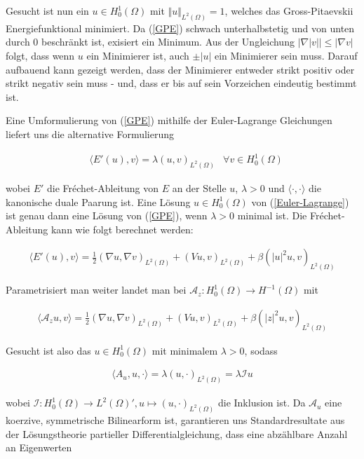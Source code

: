 \documentclass[final,bibliography=totocnumbered]{include/seminar}
\newcommand{\Ltwo}{\ensuremath{{L^2(\Omega)}}}
\newcommand{\Honez}{\ensuremath{{H^1_0(\Omega)}}}
\newcommand{\Hdual}{\ensuremath{{H^{-1}(\Omega)}}}
\newcommand{\mA}{\ensuremath{\mathcal{A}}}
\newcommand{\mI}{\ensuremath{\mathcal{I}}}
\newcommand{\GPEnergy}{Gross-Pitaevskii Energiefunktional}
\theoremstyle{break}
\begin{document}
\medskip

Gesucht ist nun ein $u \in \Honez$ mit $\Vert u \Vert_\Ltwo = 1$, welches das {\GPEnergy} minimiert.
Da (\ref{GPE}) schwach unterhalbstetig und von unten durch $0$ beschränkt ist,
exisiert ein Minimum.
Aus der Ungleichung $\vert\nabla\vert v \vert\vert \leq \vert\nabla v\vert$
folgt, dass wenn $u$ ein Minimierer ist, auch $\pm \vert u \vert$ ein Minimierer
sein muss.
Darauf aufbauend kann gezeigt werden, dass der Minimierer entweder strikt
positiv oder strikt negativ sein muss - und, dass er bis auf sein Vorzeichen
eindeutig bestimmt ist.\cite{sign}

\medskip

Eine Umformulierung von (\ref{GPE}) mithilfe der Euler-Lagrange Gleichungen
liefert uns die alternative Formulierung

\begin{align}\label{Euler-Lagrange}
    &\langle E'(u), v \rangle = \lambda(u,v)_\Ltwo &\forall v \in \Honez
\end{align}

wobei $E'$ die Fréchet-Ableitung von $E$ an der Stelle $u$, $\lambda > 0$
und $\langle \cdot,\cdot \rangle$ die kanonische duale Paarung ist.
Eine Lösung $u \in \Honez$ von (\ref{Euler-Lagrange}) ist genau dann eine Lösung von (\ref{GPE}),
wenn $\lambda > 0$ minimal ist. Die Fréchet-Ableitung kann wie folgt berechnet werden:

\begin{align}
    \langle E'(u), v\rangle = \frac{1}{2}(\nabla u, \nabla v)_\Ltwo
    + (Vu, v)_\Ltwo + \beta(\vert u \vert^2 u, v)_\Ltwo
\end{align}

Parametrisiert man weiter landet man bei $\mA_z: \Honez \rightarrow \Hdual$ mit

\begin{align}
    \langle\mA_z u, v\rangle = \frac{1}{2}(\nabla u, \nabla v)_\Ltwo
    + (Vu, v)_\Ltwo + \beta(\vert z \vert^2 u, v)_\Ltwo
\end{align}

Gesucht ist also das $u \in \Honez$ mit minimalem $\lambda > 0$, sodass

\begin{align}\label{EVP}
    \langle A_u, u, \cdot\rangle = \lambda(u, \cdot)_\Ltwo = \lambda\mI u
\end{align}

wobei $\mI: \Honez \rightarrow \Ltwo', u \mapsto (u, \cdot)_\Ltwo$ die Inklusion
ist.
Da $\mA_u$ eine koerzive, symmetrische Bilinearform ist, garantieren uns
Standardresultate aus der Lösungstheorie partieller Differentialgleichung,
dass eine abzählbare Anzahl an Eigenwerten
\end{document}
